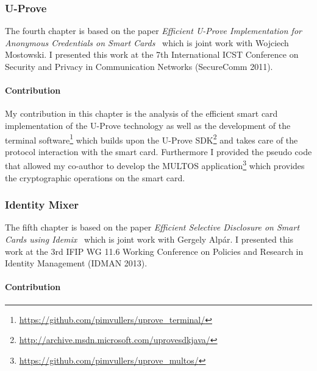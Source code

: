 \subsubsection{U-Prove}

The fourth chapter is based on the paper \emph{Efficient U-Prove Implementation
for Anonymous Credentials on Smart Cards}~\cite{MostowskiVullers11} which is
joint work with Wojciech Mostowski. I presented this work at the 7th
International ICST Conference on Security and Privacy in Communication Networks
(SecureComm 2011).

\paragraph{Contribution}

My contribution in this chapter is the analysis of the efficient smart card
implementation of the U-Prove technology as well as the development of the
terminal software\footnote{\url{https://github.com/pimvullers/uprove_terminal/}}
which builds upon the U-Prove SDK\footnote{\url{http://archive.msdn.microsoft.com/uprovesdkjava/}}
and takes care of the protocol interaction with the smart card. Furthermore I
provided the pseudo code that allowed my co-author to develop the MULTOS
application\footnote{\url{https://github.com/pimvullers/uprove_multos/}} which
provides the cryptographic operations on the smart card.

\subsubsection{Identity Mixer}

The fifth chapter is based on the paper \emph{Efficient Selective Disclosure on
Smart Cards using Idemix}~\cite{VullersAlpar2013} which is joint work with
Gergely Alp\'ar. I presented this work at the 3rd IFIP WG 11.6 Working
Conference on Policies and Research in Identity Management (IDMAN 2013).

\paragraph{Contribution}

